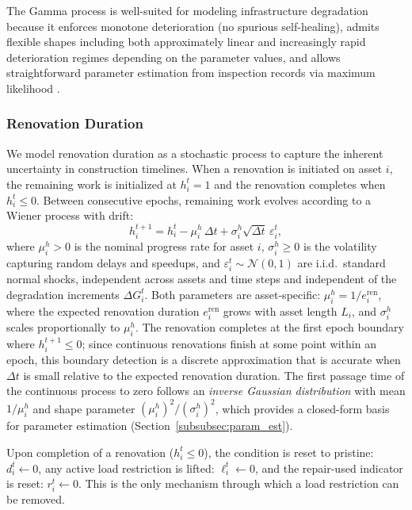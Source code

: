 \documentclass[3p, twocolumn]{elsarticle}
\begin{document}
The Gamma process is well-suited for modeling infrastructure degradation because it enforces monotone deterioration (no spurious self-healing), admits flexible shapes including both approximately linear and increasingly rapid deterioration regimes depending on the parameter values, and allows straightforward parameter estimation from inspection records via maximum likelihood \citep{van_noortwijk_survey_2009, wangConstructionOptimizationClosed2021}.

\subsubsection{Renovation Duration}

We model renovation duration as a stochastic process to capture the inherent uncertainty in construction timelines. When a renovation is initiated on asset $i$, the remaining work is initialized at $h_i^t = 1$ and the renovation completes when $h_i^t \leq 0$. Between consecutive epochs, remaining work evolves according to a Wiener process with drift:
\begin{equation}
    h_i^{t+1} = h_i^t - \mu_i^h \, \Delta t + \sigma_i^h \sqrt{\Delta t} \, \varepsilon_i^t,
    \label{eq:renovation_duration}
\end{equation}
where $\mu_i^h > 0$ is the nominal progress rate for asset $i$, $\sigma_i^h \geq 0$ is the volatility capturing random delays and speedups, and $\varepsilon_i^t \sim \mathcal{N}(0, 1)$ are i.i.d.\ standard normal shocks, independent across assets and time steps and independent of the degradation increments $\Delta G_i^t$. Both parameters are asset-specific: $\mu_i^h = 1/e_i^{\text{ren}}$, where the expected renovation duration $e_i^{\text{ren}}$ grows with asset length $L_i$, and $\sigma_i^h$ scales proportionally to $\mu_i^h$. The renovation completes at the first epoch boundary where $h_i^{t+1} \leq 0$; since continuous renovations finish at some point within an epoch, this boundary detection is a discrete approximation that is accurate when $\Delta t$ is small relative to the expected renovation duration. The first passage time of the continuous process to zero follows an \emph{inverse Gaussian distribution} with mean $1/\mu_i^h$ and shape parameter $(\mu_i^h)^2/(\sigma_i^h)^2$, which provides a closed-form basis for parameter estimation (Section~\ref{subsubsec:param_est}).

Upon completion of a renovation ($h_i^t \leq 0$), the condition is reset to pristine: $d_i^t \leftarrow 0$, any active load restriction is lifted: $\ell_i^t \leftarrow 0$, and the repair-used indicator is reset: $r_i^t \leftarrow 0$. This is the only mechanism through which a load restriction can be removed.
\end{document}

